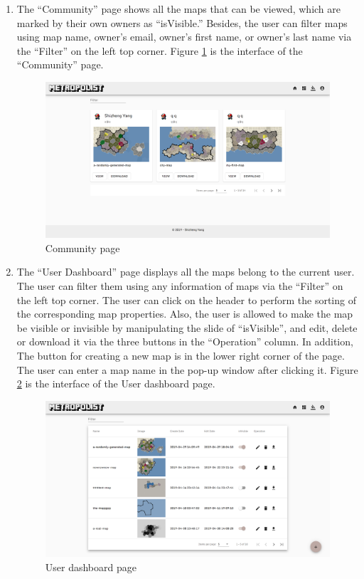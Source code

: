 \begin{enumerate}
  \item The ``Community'' page shows all the maps that can be viewed, which are marked by their own owners as ``isVisible.'' Besides, the user can filter maps using map name, owner's email, owner's first name, or owner's last name via the ``Filter'' on the left top corner. Figure \ref{fig:GUI community} is the interface of the ``Community'' page.

  \begin{figure}[htbp]
    \includegraphics[width=\textwidth]{section04/assets/GUI-community.png}
    \caption{Community page}
    \label{fig:GUI community}
  \end{figure}

  \item The ``User Dashboard'' page displays all the maps belong to the current user. The user can filter them using any information of maps via the ``Filter'' on the left top corner. The user can click on the header to perform the sorting of the corresponding map properties. Also, the user is allowed to make the map be visible or invisible by manipulating the slide of ``isVisible'', and edit, delete or download it via the three buttons in the ``Operation'' column. In addition, The button for creating a new map is in the lower right corner of the page. The user can enter a map name in the pop-up window after clicking it. Figure \ref{fig:GUI user dashboard} is the interface of the User dashboard page.

  \begin{figure}[htbp]
    \includegraphics[width=\textwidth]{section04/assets/GUI-user.png}
    \caption{User dashboard page}
    \label{fig:GUI user dashboard}
  \end{figure}


\end{enumerate}
